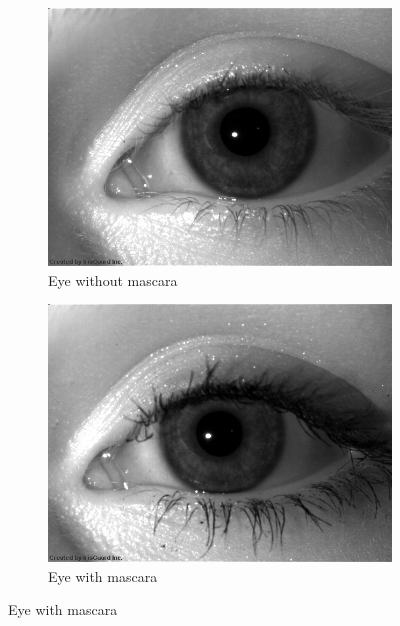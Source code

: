 \documentclass[10pt,twocolumn,letterpaper]{article}
\begin{document}
\begin{figure}[!ht]
    \captionsetup[subfigure]{justification=centering}
    \centering
    \begin{subfigure}[b]{0.49\linewidth}
        \centering
        \includegraphics[width=\textwidth]{img/bxgrid-5803-863204.jpg}
        \caption{Eye without mascara}
        \label{fig:eyenomasc}
    \end{subfigure}
    \hfill
    \begin{subfigure}[b]{0.49\linewidth}
        \centering
        \includegraphics[width=\textwidth]{img/bxgrid-5803-822674.jpg}
        \caption{Eye with mascara}

\end{subfigure}
\end{figure}
\end{document}
